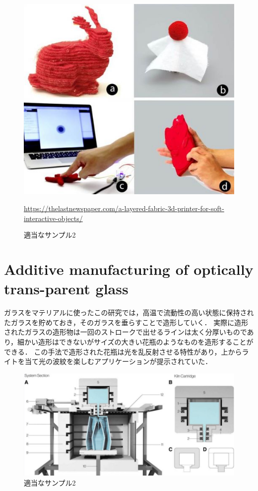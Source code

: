 \begin{figure}[H]
  \centering
  \includegraphics[width=10truecm]{./fig/ALayered.jpg}
  \caption{適当なサンプル2}
  \url{https://thelastnewspaper.com/a-layered-fabric-3d-printer-for-soft-interactive-objects/} %
  \label{fig:ferret}
\end{figure}



\section{ Additive manufacturing of optically trans-parent glass\cite{d}}
\label{sec:enum}
ガラスをマテリアルに使ったこの研究では，高温で流動性の高い状態に保持されたガラスを貯めておき，そのガラスを垂らすことで造形していく．
実際に造形されたガラスの造形物は一回のストロークで出せるラインは太く分厚いものであり，細かい造形はできないがサイズの大きい花瓶のようなものを造形することができる．
この手法で造形された花瓶は光を乱反射させる特性があり，上からライトを当て光の波紋を楽しむアプリケーションが提示されていた．

\begin{figure}[H]
  \centering
  \includegraphics[width=12.5truecm]{./fig/Additive2.jpg}
  \caption{適当なサンプル2}
  \label{fig:ferret}
\end{figure}

